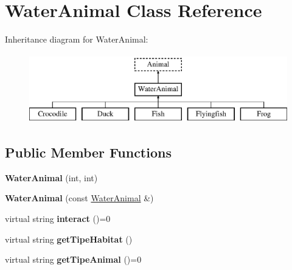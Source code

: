\hypertarget{classWaterAnimal}{\section{Water\-Animal Class Reference}
\label{classWaterAnimal}
}
Inheritance diagram for Water\-Animal\-:\begin{figure}[H]
\begin{center}
\leavevmode
\includegraphics[height=3.000000cm]{classWaterAnimal}
\end{center}
\end{figure}
\subsection*{Public Member Functions}
\begin{DoxyCompactItemize}
\item 
\hypertarget{classWaterAnimal_a23d00047948b4b37186540ceb6d73559}{{\bfseries Water\-Animal} (int, int)}\label{classWaterAnimal_a23d00047948b4b37186540ceb6d73559}

\item 
\hypertarget{classWaterAnimal_a6b05aefda40def7833a1e8556faefbe2}{{\bfseries Water\-Animal} (const \hyperlink{classWaterAnimal}{Water\-Animal} \&)}\label{classWaterAnimal_a6b05aefda40def7833a1e8556faefbe2}

\item 
\hypertarget{classWaterAnimal_a69b278c7cf7c9095461c4e428e4b3c52}{virtual string {\bfseries interact} ()=0}\label{classWaterAnimal_a69b278c7cf7c9095461c4e428e4b3c52}

\item 
\hypertarget{classWaterAnimal_aa9c9c82092a8c7d248d2a96c2ea15073}{virtual string {\bfseries get\-Tipe\-Habitat} ()}\label{classWaterAnimal_aa9c9c82092a8c7d248d2a96c2ea15073}

\item 
\hypertarget{classWaterAnimal_ad64d5de05465a6cbd11fd2d83d507f74}{virtual string {\bfseries get\-Tipe\-Animal} ()=0}\label{classWaterAnimal_ad64d5de05465a6cbd11fd2d83d507f74}

\end{DoxyCompactItemize}
